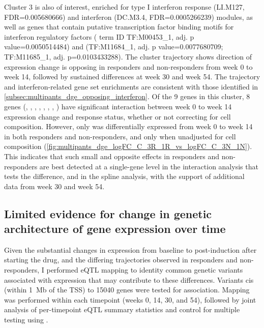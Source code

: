 Cluster 3 is also of interest, enriched for type I interferon response (LI.M127, FDR=\num{0.005680666}) and interferon (DC.M3.4, FDR=\num{0.0005266239}) modules,
as well as genes that contain putative transcription factor binding motifs for interferon regulatory factors  ( term ID TF:M00453\_1, adj. p value=\num{0.0050514484}) 
and  (TF:M11684\_1, adj. p value=\num{0.0077680709}; TF:M11685\_1, adj. p=\num{0.0103433288}).
The cluster trajectory shows direction of expression change is opposing in responders and non-responders from week 0 to week 14, followed by sustained differences at week 30 and week 54.
The trajectory and interferon-related gene set enrichments are consistent with those identified in \cref{subsec:multipants_dge_opposing_interferon}.
Of the 9 genes in this cluster, 8 genes (, , , , , , , )
have significant interaction between week 0 to week 14 expression change and response status,
whether or not correcting for cell composition.
However, only  was differentially expressed from week 0 to week 14 in both responders and non-responders,
and only when unadjusted for cell composition (\cref{fig:multipants_dge_logFC_C_3R_1R_vs_logFC_C_3N_1N}).
This indicates that such small and opposite effects in responders and non-responders are best detected at a single-gene level in the interaction analysis that tests the difference,
and in the spline analysis, with the support of additional data from week 30 and week 54.

    
\subsection{Limited evidence for change in genetic architecture of gene expression over time}

Given the substantial changes in expression from baseline to post-induction after starting the drug, and the differing trajectories observed in responders and non-responders, 
I performed \gls{eQTL} mapping to identity common genetic variants associated with expression that may contribute to these differences.
Variants cis (within \SI{1}{\mega b} of the TSS) to 15040 genes were tested for association.
Mapping was performed within each timepoint (weeks 0, 14, 30, and 54),
followed by joint analysis of per-timepoint \gls{eQTL} summary statistics and control for multiple testing using .

